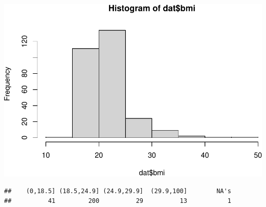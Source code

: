 \documentclass[
]{article}
\newenvironment{Shaded}{\begin{snugshade}}{\end{snugshade}}
\newcommand{\AttributeTok}[1]{\textcolor[rgb]{0.77,0.63,0.00}{#1}}
\newcommand{\DecValTok}[1]{\textcolor[rgb]{0.00,0.00,0.81}{#1}}
\newcommand{\FloatTok}[1]{\textcolor[rgb]{0.00,0.00,0.81}{#1}}
\newcommand{\FunctionTok}[1]{\textcolor[rgb]{0.00,0.00,0.00}{#1}}
\newcommand{\NormalTok}[1]{#1}
\newcommand{\OtherTok}[1]{\textcolor[rgb]{0.56,0.35,0.01}{#1}}
\newcommand{\SpecialCharTok}[1]{\textcolor[rgb]{0.00,0.00,0.00}{#1}}
\begin{document}
\begin{Shaded}
\end{Shaded}

\includegraphics{050_quest_groups_files/figure-latex/unnamed-chunk-2-16.pdf}

\begin{Shaded}
\end{Shaded}

\begin{verbatim}
##    (0,18.5] (18.5,24.9] (24.9,29.9]  (29.9,100]        NA's 
##          41         200          29          13           1
\end{verbatim}
\end{document}
